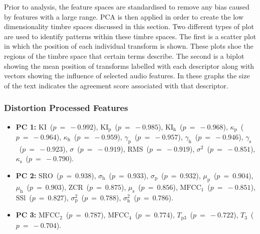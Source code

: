 		Prior to analysis, the feature spaces are standardised to remove any bias caused by features with a large
		range. PCA is then applied in order to create the low dimensionality timbre spaces discussed in this
		section. Two different types of plot are used to identify patterns within these timbre spaces. The first is
		a scatter plot in which the position of each individual transform is shown. These plots shoe the regions of
		the timbre space that certain terms describe. The second is a biplot showing the mean position of
		transforms labelled with each descriptor along with vectors showing the influence of selected audio
		features. In these graphs the size of the text indicates the agreement score associated with that
		descriptor.

		\subsubsection*{Distortion Processed Features}
			\begin{itemize}
				\item {\bf{PC 1:}} $\textrm{KI}$~($p~=~-0.992$), $\textrm{KI}_{\textrm{p}}$~($p~=~-0.985$),
					$\textrm{KI}_{\textrm{h}}$~($p~=~-0.968$), $\kappa_{\textrm{p}}$~($p~=~-0.964$),
					$\kappa_{\textrm{h}}$~($p~=~-0.959$), $\gamma_{\textrm{p}}$~($p~=~-0.957$),
					$\gamma_{\textrm{h}}$~($p~=~-0.946$), $\gamma_{\textrm{s}}$~($p~=~-0.923$),
					$\sigma$~($p~=~-0.919$), $\textrm{RMS}$~($p~=~-0.919$),
					$\sigma^{2}$~($p~=~-0.851$), $\kappa_{\textrm{s}}$~($p~=~-0.790$).
				\item {\bf{PC 2:}} $\textrm{SRO}$~($p~=~ 0.938$), $\sigma_{\textrm{h}}$~($p~=~ 0.933$),
					$\sigma_{\textrm{p}}$~($p~=~ 0.932$), $\mu_{\textrm{p}}$~($p~=~ 0.904$),
					$\mu_{\textrm{h}}$~($p~=~ 0.903$), $\textrm{ZCR}$~($p~=~ 0.875$),
					$\mu_{\textrm{s}}$~($p~=~ 0.856$), $\textrm{MFCC}_{1}$~($p~=~-0.851$),
					$\textrm{SSl}$~($p~=~ 0.827$), $\sigma_{\textrm{p}}^{2}$~($p~=~ 0.788$),
					$\sigma_{\textrm{h}}^{2}$~($p~=~ 0.786$).
				\item {\bf{PC 3:}} $\textrm{MFCC}_{2}$~($p~=~ 0.787$), $\textrm{MFCC}_{4}$~($p~=~ 0.774$),
					$T_{\textrm{p}3}$~($p~=~-0.722$), $T_{3}$~($p~=~-0.704$).
			\end{itemize}


